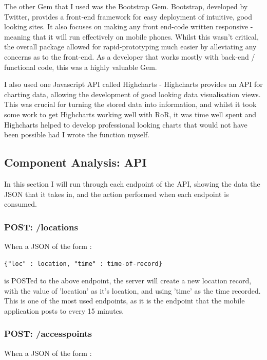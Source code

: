 \documentclass[11pt]{informatics-report}
\begin{document}
The other Gem that I used was the Bootstrap Gem. Bootstrap, developed by Twitter, provides a front-end framework for easy deployment of intuitive, good looking sites. It also focuses on making any front end-code written responsive - meaning that it will run effectively on mobile phones. Whilst this wasn't critical, the overall package allowed for rapid-prototyping much easier by alleviating any concerns as to the front-end. As a developer that works mostly with back-end / functional code, this was a highly valuable Gem.

I also used one Javascript API called Highcharts - Highcharts provides an API for charting data, allowing the development of good looking data visualisation views. This was crucial for turning the stored data into information, and whilst it took some work to get Highcharts working well with RoR, it was time well spent and Highcharts helped to develop professional looking charts that would not have been possible had I wrote the function myself.

\subsection{Component Analysis: API}

In this section I will run through each endpoint of the API, showing the data the JSON that it takes in, and the action performed when each endpoint is consumed.

\subsubsection{POST: /locations}

When a JSON of the form :

\begin{verbatim}
{"loc" : location, "time" : time-of-record}
\end{verbatim}

is POSTed to the above endpoint, the server will create a new location record, with the value of 'location' as it's location, and using 'time' as the time recorded. This is one of the most used endpoints, as it is the endpoint that the mobile application posts to every 15 minutes.

\subsubsection{POST: /accesspoints}

When a JSON of the form :
\end{document}
